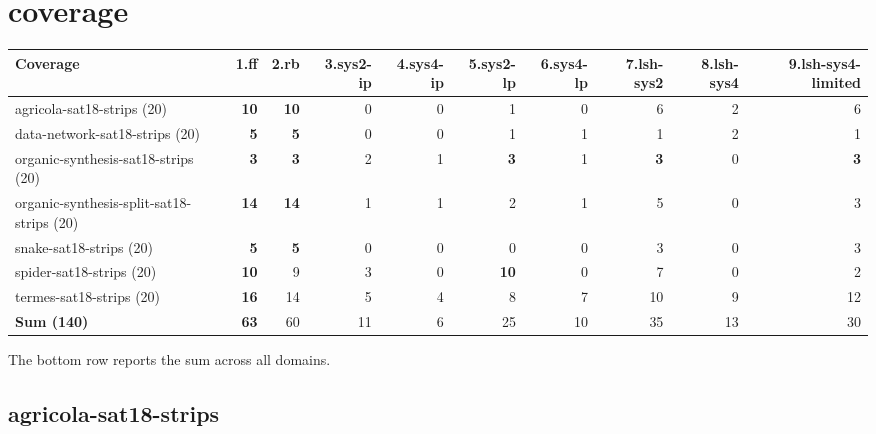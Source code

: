 \documentclass{article}
\newcommand{\numtasks}[1]{\small{(#1)}}
\begin{document}
\hypertarget{coverage}{}
\section*{coverage}

\begin{tabular}{@{}lrrrrrrrrr@{}}
Coverage & 1.ff & 2.rb & 3.sys2-ip & 4.sys4-ip & 5.sys2-lp & 6.sys4-lp & 7.lsh-sys2 & 8.lsh-sys4 & 9.lsh-sys4-limited \\
\midrule
agricola-sat18-strips \numtasks{20} & \textbf{10} & \textbf{10} & 0 & 0 & 1 & 0 & 6 & 2 & 6 \\
data-network-sat18-strips \numtasks{20} & \textbf{5} & \textbf{5} & 0 & 0 & 1 & 1 & 1 & 2 & 1 \\
organic-synthesis-sat18-strips \numtasks{20} & \textbf{3} & \textbf{3} & 2 & 1 & \textbf{3} & 1 & \textbf{3} & 0 & \textbf{3} \\
organic-synthesis-split-sat18-strips \numtasks{20} & \textbf{14} & \textbf{14} & 1 & 1 & 2 & 1 & 5 & 0 & 3 \\
snake-sat18-strips \numtasks{20} & \textbf{5} & \textbf{5} & 0 & 0 & 0 & 0 & 3 & 0 & 3 \\
spider-sat18-strips \numtasks{20} & \textbf{10} & 9 & 3 & 0 & \textbf{10} & 0 & 7 & 0 & 2 \\
termes-sat18-strips \numtasks{20} & \textbf{16} & 14 & 5 & 4 & 8 & 7 & 10 & 9 & 12 \\
\textbf{Sum \numtasks{140}} & \textbf{63} & 60 & 11 & 6 & 25 & 10 & 35 & 13 & 30 \\
\end{tabular}

The bottom row reports the sum across all domains.

\hypertarget{coverage-agricola-sat18-strips}{}
\subsection*{agricola-sat18-strips}
\end{document}
